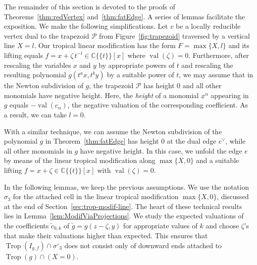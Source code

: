 \documentclass[11pt]{amsart}
\numberwithin{equation}{section}
\theoremstyle{plain}
\theoremstyle{definition}
\theoremstyle{remark}
\begin{document}
The remainder of this section is devoted to the proofs of
Theorems~\ref{thm:redVertex} and~\ref{thm:fatEdge}. A series of lemmas
facilitate the exposition.  We make the following simplifications.
Let $v$ be a locally reducible vertex dual to the trapezoid ${\mathcal{P}}$ from
Figure~\ref{fig:trapezoid} traversed by a vertical line $X=l$. Our
tropical linear modification has the form $F=\max\{X,l\}$ and its
lifting equals $f=x+{\zeta}\,t^{-l}\in {{\mathbb{C}}\{\!\{t
\}\!\}}[x]$ where
$\operatorname{val}({\zeta})=0$. Furthermore, after rescaling the variables $x$ and $y$
by appropriate powers of $t$ and rescaling the resulting polynomial
$
g(t^ax,t^by)$ by a suitable power of $t$, we may assume that in the
Newton subdivision of $g$, the trapezoid ${\mathcal{P}}$ has height 0 and all
other monomials have negative height. Here, the \emph{height} of a
monomial $\underline{x}^{\alpha}$ appearing in $g$ equals
$-\operatorname{val}(c_{\alpha})$, the negative valuation of the corresponding
coefficient. As a result, we can take $l=0$.

With a similar technique, we can assume the Newton subdivision of the
polynomial $g$ in Theorem~\ref{thm:fatEdge} has height $0$ at the dual
edge $e^{\vee}$, while all other monomials in $g$ have negative
height.  In this case, we unfold the edge $e$ by means of the linear
tropical modification along $\max\{X,0\}$ and a suitable lifting
$f=x+{\zeta} \in {{\mathbb{C}}\{\!\{t
\}\!\}}[x]$ with $\operatorname{val}({\zeta})=0$.
 
In the following lemmas, we keep the previous assumptions. We use  the
notation $\sigma_3$ for the attached cell in the linear tropical
modification $\max\{X,0\}$, discussed at the end of
Section~\ref{sec:trop-modif-line}. 
The heart of these technical results lies in
Lemma~\ref{lem:ModifViaProjections}. We study the expected valuations
of the coefficients $\tilde{c}_{0,k}$ of $\tilde{g}=g(z-{\zeta},y)$ for appropriate values of $k$
and choose  ${\zeta}$'s that make their valuations  higher
than expected. This  ensures that $\operatorname{Trop}(I_{g,f})\cap {\sigma^{\circ}}_3$
does not  consist only of downward ends attached to $\operatorname{Trop}(g)\cap (X=0)$.
\end{document}
